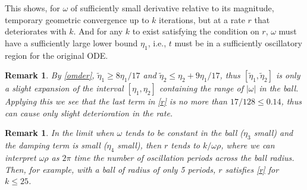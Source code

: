 \documentclass[10pt]{article}
\newtheorem{rmk}[thm]{Remark}
\newcommand{\om}{\omega}
\newcommand{\te}{\tilde\eta}
\begin{document}
%
This shows, for $\om$ of sufficiently small derivative
relative to its magnitude,
temporary geometric convergence up to $k$ iterations,
but at a rate $r$ that deteriorates with $k$.
And for any $k$ to exist satisfying the condition on $r$, $\om$ must have
a sufficiently large lower bound $\eta_1$, i.e., $t$
must be in a sufficiently oscillatory region for the original ODE.

\begin{rmk}\label{slight}
    By \cref{omder}, $\te_1 \ge 8\eta_1/17$ and $\te_2 \le \eta_2 + 9\eta_1/17$,
  thus $[\te_1,\te_2]$ is only a slight
  expansion of the interval $[\eta_1,\eta_2]$ containing the range of
    $|\om|$ in the ball.
  Applying this we see that the last term in \cref{r}
    is no more than $17/128 \leq 0.14$, thus can cause only slight deterioration in the rate.
\end{rmk}

\begin{rmk}
    In the limit when $\om$ tends to be constant in the ball ($\eta_3$ small) and the damping term is small ($\eta_4$ small),
  then $r$ tends to $k/\om \rho$, where we can interpret $\om\rho$ as $2\pi$
    time the number of oscillation periods across the ball radius.
    Then, for example, with a ball of radius of only 5 periods, $r$ satisfies \cref{r}
    for $k\le 25$.
\end{rmk}
\end{document}
